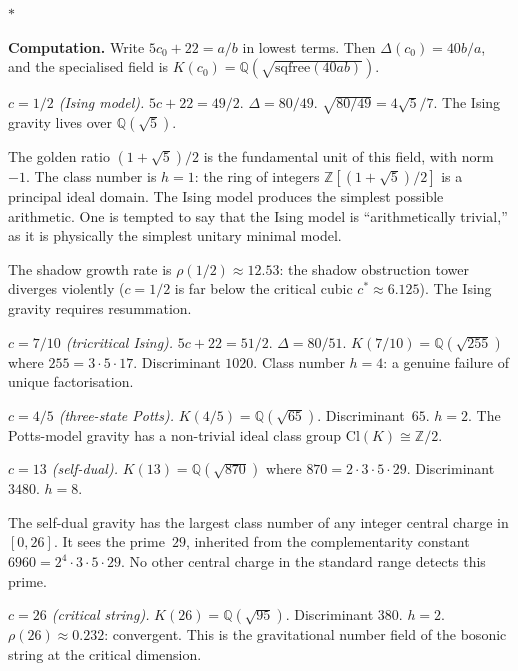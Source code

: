 \documentclass[11pt]{article}
\newcommand{\Z}{\mathbb{Z}}
\newcommand{\Q}{\mathbb{Q}}
\newcommand{\sep}{\bigskip\begin{center}$*$\end{center}\medskip}
\begin{document}
\sep

\noindent\textbf{Computation.}\enspace
Write $5c_0 + 22 = a/b$ in lowest terms.  Then
$\Delta(c_0) = 40b/a$, and the specialised field is
$K(c_0) = \Q(\sqrt{\mathrm{sqfree}(40ab)})$.

\medskip

\noindent\textit{$c = 1/2$ (Ising model).}\enspace
$5c + 22 = 49/2$.  $\Delta = 80/49$.
$\sqrt{80/49} = 4\sqrt{5}/7$.
The Ising gravity lives over $\Q(\sqrt{5})$.

The golden ratio $(1+\sqrt{5})/2$ is the fundamental unit
of this field, with norm $-1$.  The class number is $h = 1$:
the ring of integers $\Z[(1+\sqrt{5})/2]$ is a principal ideal
domain.  The Ising model produces the simplest possible
arithmetic.  One is tempted to say that the Ising model is
``arithmetically trivial,'' as it is physically the simplest
unitary minimal model.

The shadow growth rate is $\rho(1/2) \approx 12.53$: the
shadow obstruction tower diverges violently ($c = 1/2$ is far below
the critical cubic $c^* \approx 6.125$).  The Ising gravity
requires resummation.

\medskip

\noindent\textit{$c = 7/10$ (tricritical Ising).}\enspace
$5c + 22 = 51/2$.  $\Delta = 80/51$.
$K(7/10) = \Q(\sqrt{255})$ where $255 = 3 \cdot 5 \cdot 17$.
Discriminant $1020$.  Class number $h = 4$: a genuine failure
of unique factorisation.

\medskip

\noindent\textit{$c = 4/5$ (three-state Potts).}\enspace
$K(4/5) = \Q(\sqrt{65})$.  Discriminant~$65$.  $h = 2$.
The Potts-model gravity has a non-trivial ideal class group
$\mathrm{Cl}(K) \cong \Z/2$.

\medskip

\noindent\textit{$c = 13$ (self-dual).}\enspace
$K(13) = \Q(\sqrt{870})$ where $870 = 2 \cdot 3 \cdot 5 \cdot 29$.
Discriminant $3480$.  $h = 8$.

The self-dual gravity has the largest class number of any
integer central charge in $[0, 26]$.  It sees the prime~$29$,
inherited from the complementarity constant
$6960 = 2^4 \cdot 3 \cdot 5 \cdot 29$.  No other central
charge in the standard range detects this prime.

\medskip

\noindent\textit{$c = 26$ (critical string).}\enspace
$K(26) = \Q(\sqrt{95})$.  Discriminant $380$.  $h = 2$.
$\rho(26) \approx 0.232$: convergent.  This is the
gravitational number field of the bosonic string at the
critical dimension.
\end{document}
